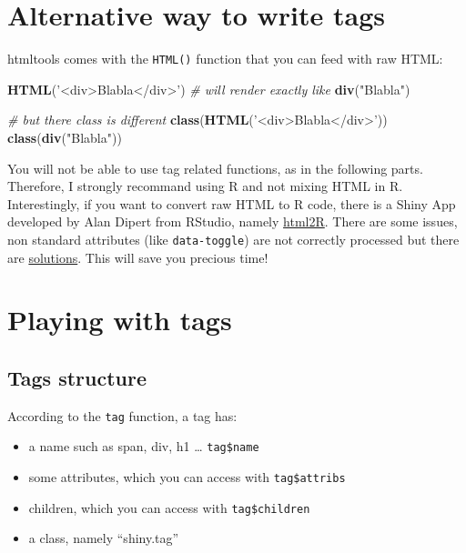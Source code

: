 \documentclass[
]{book}
\newenvironment{Shaded}{\begin{snugshade}}{\end{snugshade}}
\newcommand{\CommentTok}[1]{\textcolor[rgb]{0.56,0.35,0.01}{\textit{#1}}}
\newcommand{\KeywordTok}[1]{\textcolor[rgb]{0.13,0.29,0.53}{\textbf{#1}}}
\newcommand{\NormalTok}[1]{#1}
\newcommand{\StringTok}[1]{\textcolor[rgb]{0.31,0.60,0.02}{#1}}
\providecommand{\tightlist}{%
  \setlength{\itemsep}{0pt}\setlength{\parskip}{0pt}}
\begin{document}
\hypertarget{alternative-way-to-write-tags}{%
\section{Alternative way to write tags}\label{alternative-way-to-write-tags}}

htmltools comes with the \texttt{HTML()} function that you can feed with raw HTML:

\begin{Shaded}
\begin{Highlighting}[]
\KeywordTok{HTML}\NormalTok{(}\StringTok{'<div>Blabla</div>'}\NormalTok{)}
\CommentTok{# will render exactly like}
\KeywordTok{div}\NormalTok{(}\StringTok{"Blabla"}\NormalTok{)}

\CommentTok{# but there class is different}
\KeywordTok{class}\NormalTok{(}\KeywordTok{HTML}\NormalTok{(}\StringTok{'<div>Blabla</div>'}\NormalTok{))}
\KeywordTok{class}\NormalTok{(}\KeywordTok{div}\NormalTok{(}\StringTok{"Blabla"}\NormalTok{))}
\end{Highlighting}
\end{Shaded}

You will not be able to use tag related functions, as in the following parts.
Therefore, I strongly recommand using R and not mixing HTML in R. Interestingly, if
you want to convert raw HTML to R code, there is a Shiny App developed by Alan
Dipert from RStudio, namely \href{https://github.com/alandipert/html2r}{html2R}. There
are some issues, non standard attributes (like \texttt{data-toggle}) are not correctly processed but there are \href{https://github.com/alandipert/html2r/issues/2}{solutions}. This will save you precious time!

\hypertarget{playing-with-tags}{%
\section{Playing with tags}\label{playing-with-tags}}

\hypertarget{tags-structure}{%
\subsection{Tags structure}\label{tags-structure}}

According to the \texttt{tag} function, a tag has:

\begin{itemize}
\tightlist
\item
  a name such as span, div, h1 \ldots{} \texttt{tag\$name}
\item
  some attributes, which you can access with \texttt{tag\$attribs}
\item
  children, which you can access with \texttt{tag\$children}
\item
  a class, namely ``shiny.tag''
\end{itemize}
\end{document}
